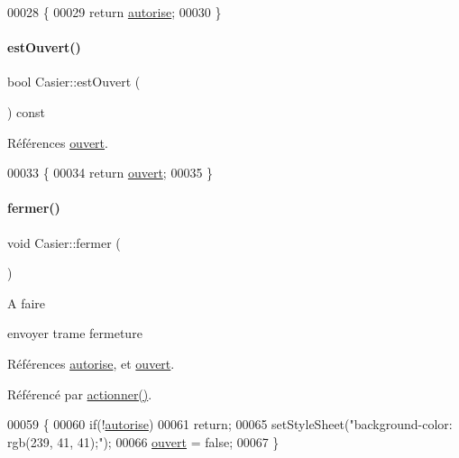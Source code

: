 \begin{DoxyCode}
00028 \{
00029     \textcolor{keywordflow}{return} \hyperlink{class_casier_a2dd9fbe4a93685080a9b5c8f69e3f29a}{autorise};
00030 \}
\end{DoxyCode}
\mbox{\label{class_casier_ab26fd4da845423355835da8d445ed5dd}} 
\paragraph{\texorpdfstring{est\+Ouvert()}{estOuvert()}}
{\footnotesize\ttfamily bool Casier\+::est\+Ouvert (\begin{DoxyParamCaption}{ }\end{DoxyParamCaption}) const}



Références \hyperlink{class_casier_afe544ed1a87ce714a9fbbe16126669e4}{ouvert}.


\begin{DoxyCode}
00033 \{
00034     \textcolor{keywordflow}{return} \hyperlink{class_casier_afe544ed1a87ce714a9fbbe16126669e4}{ouvert};
00035 \}
\end{DoxyCode}
\mbox{\label{class_casier_a4a6051d72548b83d4b2dfaf189ae6c72}} 
\paragraph{\texorpdfstring{fermer()}{fermer()}}
{\footnotesize\ttfamily void Casier\+::fermer (\begin{DoxyParamCaption}{ }\end{DoxyParamCaption})}

\begin{DoxyRefDesc}{A faire}
\item[\hyperlink{todo__todo000002}{A faire}]envoyer trame fermeture \end{DoxyRefDesc}


Références \hyperlink{class_casier_a2dd9fbe4a93685080a9b5c8f69e3f29a}{autorise}, et \hyperlink{class_casier_afe544ed1a87ce714a9fbbe16126669e4}{ouvert}.



Référencé par \hyperlink{class_casier_a9182fdde9d86e8f67e4d96ca3dad5eaa}{actionner()}.


\begin{DoxyCode}
00059 \{
00060     \textcolor{keywordflow}{if}(!\hyperlink{class_casier_a2dd9fbe4a93685080a9b5c8f69e3f29a}{autorise})
00061         \textcolor{keywordflow}{return};
00065     setStyleSheet(\textcolor{stringliteral}{"background-color: rgb(239, 41, 41);"});
00066     \hyperlink{class_casier_afe544ed1a87ce714a9fbbe16126669e4}{ouvert} = \textcolor{keyword}{false};
00067 \}
\end{DoxyCode}
\mbox{\label{class_casier_a7d25b1a4bdbe4e600734cda8fb944258}} 
